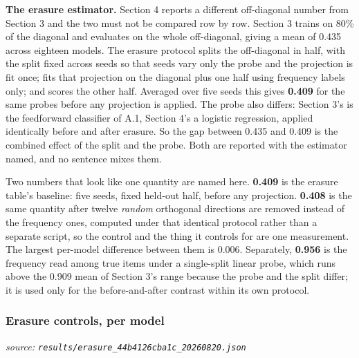 \documentclass[10pt]{article}
\begin{document}
\textbf{The erasure estimator.} Section 4 reports a different off-diagonal number from Section 3 and the two must not be compared row by row. Section 3 trains on 80\% of the diagonal and evaluates on the whole off-diagonal, giving a mean of 0.435 across eighteen models. The erasure protocol splits the off-diagonal in half, with the split fixed across seeds so that seeds vary only the probe and the projection is fit once; fits that projection on the diagonal plus one half using frequency labels only; and scores the other half. Averaged over five seeds this gives \textbf{0.409} for the same probes before any projection is applied. The probe also differs: Section 3's is the feedforward classifier of A.1, Section 4's a logistic regression, applied identically before and after erasure. So the gap between 0.435 and 0.409 is the combined effect of the split and the probe. Both are reported with the estimator named, and no sentence mixes them.

Two numbers that look like one quantity are named here. \textbf{0.409} is the erasure table's baseline: five seeds, fixed held-out half, before any projection. \textbf{0.408} is the same quantity after twelve \emph{random} orthogonal directions are removed instead of the frequency ones, computed under that identical protocol rather than a separate script, so the control and the thing it controls for are one measurement. The largest per-model difference between them is 0.006. Separately, \textbf{0.956} is the frequency read among true items under a single-split linear probe, which runs above the 0.909 mean of Section 3's range because the probe and the split differ; it is used only for the before-and-after contrast within its own protocol.

\subsubsection{Erasure controls, per model}

{\footnotesize\raggedright\sloppy \emph{source: \texttt{results/erasure\_44b4126cba1c\_20260820.json}}\par}
\end{document}
